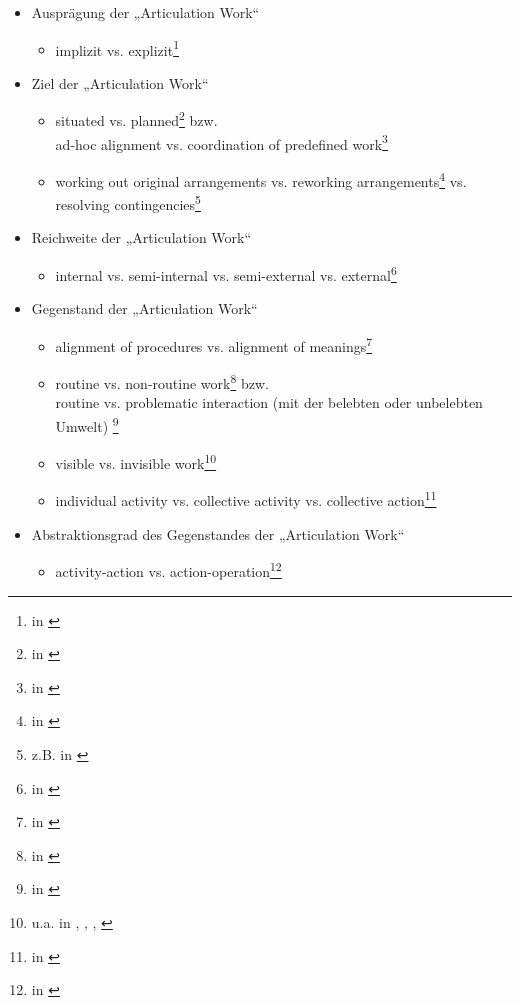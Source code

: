 \begin{itemize}
	\item Ausprägung der „Articulation Work“
	\begin{itemize}
		\item implizit vs. explizit\footnote{in \citep{Strauss93}}
	\end{itemize}
	\item Ziel der „Articulation Work“
	\begin{itemize}
		\item situated vs. planned\footnote{in \citep{Fjuk97}} bzw.\\
		 ad-hoc alignment vs. coordination of predefined work\footnote{in \citep{Schmidt00}}
		\item working out original arrangements vs. reworking arrangements\footnote{in \citep{Corbin93}} vs. resolving contingencies\footnote{z.B. in \citep{Gerson86}}
	\end{itemize}
	\item Reichweite der „Articulation Work“
	\begin{itemize}
		\item internal vs. semi-internal vs. semi-external vs. external\footnote{in \citep{Faergemann05}}
	\end{itemize}
	\item Gegenstand der „Articulation Work“
	\begin{itemize}
		\item alignment of procedures vs. alignment of meanings\footnote{in \citep{Sarini02}}
		\item routine vs. non-routine work\footnote{in \citep{Hampson05}} bzw.\\
		 routine vs. problematic interaction (mit der belebten oder unbelebten Umwelt) \footnote{in \citep{Strauss93}}
		\item visible vs. invisible work\footnote{u.a. in \citep{Suchman95}, \citep{Suchman99}, \citep{Star99}, \citep{Hampson05}}
		\item individual activity vs. collective activity vs. collective action\footnote{in \citep{Fjuk97}}
	\end{itemize}
	\item Abstraktionsgrad des Gegenstandes der „Articulation Work“
	\begin{itemize}
		\item activity-action vs. action-operation\footnote{in \citep{Fjuk97}}
	\end{itemize}
\end{itemize}

